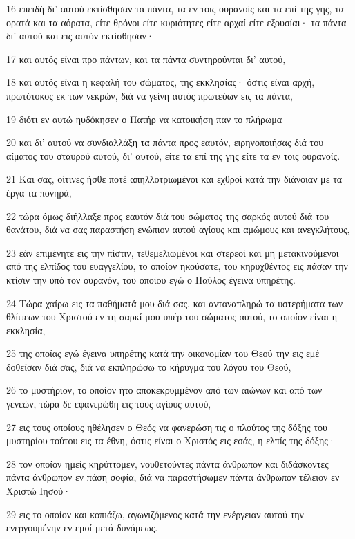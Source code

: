 \par 16 επειδή δι' αυτού εκτίσθησαν τα πάντα, τα εν τοις ουρανοίς και τα επί της γης, τα ορατά και τα αόρατα, είτε θρόνοι είτε κυριότητες είτε αρχαί είτε εξουσίαι· τα πάντα δι' αυτού και εις αυτόν εκτίσθησαν·
\par 17 και αυτός είναι προ πάντων, και τα πάντα συντηρούνται δι' αυτού,
\par 18 και αυτός είναι η κεφαλή του σώματος, της εκκλησίας· όστις είναι αρχή, πρωτότοκος εκ των νεκρών, διά να γείνη αυτός πρωτεύων εις τα πάντα,
\par 19 διότι εν αυτώ ηυδόκησεν ο Πατήρ να κατοικήση παν το πλήρωμα
\par 20 και δι' αυτού να συνδιαλλάξη τα πάντα προς εαυτόν, ειρηνοποιήσας διά του αίματος του σταυρού αυτού, δι' αυτού, είτε τα επί της γης είτε τα εν τοις ουρανοίς.
\par 21 Και σας, οίτινες ήσθε ποτέ απηλλοτριωμένοι και εχθροί κατά την διάνοιαν με τα έργα τα πονηρά,
\par 22 τώρα όμως διήλλαξε προς εαυτόν διά του σώματος της σαρκός αυτού διά του θανάτου, διά να σας παραστήση ενώπιον αυτού αγίους και αμώμους και ανεγκλήτους,
\par 23 εάν επιμένητε εις την πίστιν, τεθεμελιωμένοι και στερεοί και μη μετακινούμενοι από της ελπίδος του ευαγγελίου, το οποίον ηκούσατε, του κηρυχθέντος εις πάσαν την κτίσιν την υπό τον ουρανόν, του οποίου εγώ ο Παύλος έγεινα υπηρέτης.
\par 24 Τώρα χαίρω εις τα παθήματά μου διά σας, και ανταναπληρώ τα υστερήματα των θλίψεων του Χριστού εν τη σαρκί μου υπέρ του σώματος αυτού, το οποίον είναι η εκκλησία,
\par 25 της οποίας εγώ έγεινα υπηρέτης κατά την οικονομίαν του Θεού την εις εμέ δοθείσαν διά σας, διά να εκπληρώσω το κήρυγμα του λόγου του Θεού,
\par 26 το μυστήριον, το οποίον ήτο αποκεκρυμμένον από των αιώνων και από των γενεών, τώρα δε εφανερώθη εις τους αγίους αυτού,
\par 27 εις τους οποίους ηθέλησεν ο Θεός να φανερώση τις ο πλούτος της δόξης του μυστηρίου τούτου εις τα έθνη, όστις είναι ο Χριστός εις εσάς, η ελπίς της δόξης·
\par 28 τον οποίον ημείς κηρύττομεν, νουθετούντες πάντα άνθρωπον και διδάσκοντες πάντα άνθρωπον εν πάση σοφία, διά να παραστήσωμεν πάντα άνθρωπον τέλειον εν Χριστώ Ιησού·
\par 29 εις το οποίον και κοπιάζω, αγωνιζόμενος κατά την ενέργειαν αυτού την ενεργουμένην εν εμοί μετά δυνάμεως.


